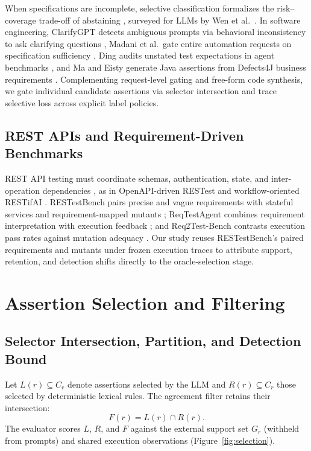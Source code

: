 \documentclass[sigconf,nonacm]{acmart}
\begin{document}
When specifications are incomplete, selective classification formalizes the risk--coverage trade-off of abstaining \cite{elyaniv2010}, surveyed for LLMs by Wen et al.\ \cite{wen2025}. In software engineering, ClarifyGPT detects ambiguous prompts via behavioral inconsistency to ask clarifying questions \cite{mu2024clarify}, Madani et al.\ gate entire automation requests on specification sufficiency \cite{madani2026}, Ding audits unstated test expectations in agent benchmarks \cite{ding2026}, and Ma and Eisty generate Java assertions from Defects4J business requirements \cite{ma2026}. Complementing request-level gating and free-form code synthesis, we gate individual candidate assertions via selector intersection and trace selective loss across explicit label policies.

\subsection{REST APIs and Requirement-Driven Benchmarks}
REST API testing must coordinate schemas, authentication, state, and inter-operation dependencies \cite{golmohammadi2024}, as in OpenAPI-driven RESTest \cite{martinlopez2021} and workflow-oriented RESTifAI \cite{kogler2025restifai}. RESTestBench pairs precise and vague requirements with stateful services and requirement-mapped mutants \cite{kogler2026bench}; ReqTestAgent combines requirement interpretation with execution feedback \cite{shi2026}; and Req2Test-Bench contrasts execution pass rates against mutation adequacy \cite{qi2026}. Our study reuses RESTestBench's paired requirements and mutants under frozen execution traces to attribute support, retention, and detection shifts directly to the oracle-selection stage.

\section{Assertion Selection and Filtering}
\subsection{Selector Intersection, Partition, and Detection Bound}
Let $L(r)\subseteq C_r$ denote assertions selected by the LLM and $R(r)\subseteq C_r$ those selected by deterministic lexical rules. The agreement filter retains their intersection:
\begin{equation}
F(r)=L(r)\cap R(r).
\label{eq:filter}
\end{equation}
The evaluator scores $L$, $R$, and $F$ against the external support set $G_r$ (withheld from prompts) and shared execution observations (Figure~\ref{fig:selection}).
\end{document}
